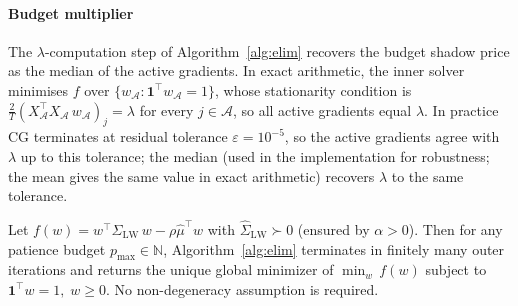 \paragraph{Budget multiplier}
The $\lambda$-computation step of Algorithm~\ref{alg:elim} recovers the budget shadow price as the median
of the active gradients. In exact arithmetic, the inner solver minimises $f$ over
$\{w_\mathcal{A} : \mathbf{1}^\top w_\mathcal{A} = 1\}$, whose stationarity
condition is $\tfrac{2}{T}(X_\mathcal{A}^\top X_\mathcal{A}\,w_\mathcal{A})_j = \lambda$
for every $j \in \mathcal{A}$, so all active gradients equal $\lambda$.
In practice CG terminates at residual tolerance $\varepsilon = 10^{-5}$, so
the active gradients agree with $\lambda$ up to this tolerance; the median (used in the implementation for robustness; the mean gives the
same value in exact arithmetic) recovers $\lambda$ to the same tolerance.

\begin{theorem}\label{thm:termination}
Let $f(w) = w^\top \hat\Sigma_{\mathrm{LW}}\,w - \rho\hat\mu^\top w$ with
$\hat\Sigma_{\mathrm{LW}} \succ 0$ (ensured by $\alpha > 0$).
Then for any patience budget $p_{\max} \in \mathbb{N}$, Algorithm~\ref{alg:elim}
terminates in finitely many outer iterations and returns the unique global minimizer
of $\min_{w}\,f(w)$ subject to $\mathbf{1}^\top w = 1,\;w \geq 0$.
No non-degeneracy assumption is required.
\end{theorem}

